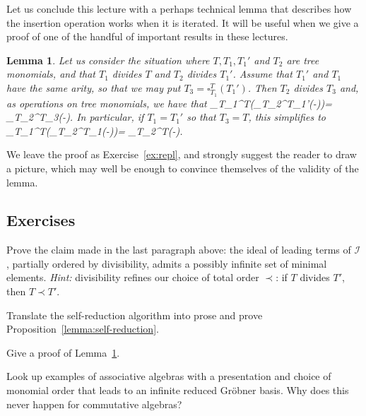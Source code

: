 \documentclass[fleqn, a4paper, twoside]{article}
\makeatletter
\newcommand{\repl}[3]{\square_{#1}^{#2}(#3)}
\newcommand{\0}{\langle 0\rangle}
\newcommand{\II}{\mathcal{I}}
\let\[\@undefined
\DeclareRobustCommand{\[}{\begin{equation}}%
\let\]\@undefined
\DeclareRobustCommand{\]}{\end{equation}}%
\theoremstyle{mytheorem}
\newtheorem{lemma}[theorem]{Lemma}
\theoremstyle{introthm}
\theoremstyle{mydefinition}
\theoremstyle{mydefinition2}
\theoremstyle{plain} %
\newcommand{\?}{\,?\,}
\theoremstyle{mytheorem}
\theoremstyle{plain} %
\makeatother
\begin{document}
Let us conclude this lecture with a perhaps technical
lemma that describes how the insertion operation
works when it is iterated. It will be useful when we
give a proof of one of the handful of important results 
in these lectures.

\begin{lemma}\label{lemma:repl}
Let us consider the situation where $T,T_1,T_1'$ and $T_2$ 
are tree monomials, and that $T_1$ divides $T$ and
$T_2$ divides $T_1'$. Assume that $T_1'$ and $T_1$ have
the same arity, so that we may put $T_3 = \repl{T_1}{T}{T_1'}$.
Then $T_2$ divides $T_3$ and, as operations on tree monomials,
we have that
\[ 
\repl{T_1}{T}{\repl{T_2}{T_1'}{-}}= 
 	\repl{T_2}{T_3}{-}.
\]
In particular, if $T_1=T_1'$ so that $T_3 = T$, this
simplifies to 
\[ 
\repl{T_1}{T}{\repl{T_2}{T_1}{-}}= 
 	\repl{T_2}{T}{-}.
\]
\end{lemma}

We leave the proof as Exercise~\ref{ex:repl}, and
strongly suggest the reader to draw a picture, which
may well be enough to convince themselves of the
validity of the lemma. 

\subsection{Exercises}

\begin{question}
Prove the claim made in the last paragraph above:
the ideal of leading terms of $\II$, partially ordered by
divisibility, admits a possibly infinite set of
minimal elements. \emph{Hint:} divisibility
refines our choice of total order $\prec$: if 
$T$ divides $T'$, then $T\prec T'$. 
\end{question}

\begin{question}\label{ex:self-reduction}
Translate the self-reduction algorithm into prose
and prove Proposition~\ref{lemma:self-reduction}.
\end{question}

\begin{question}\label{ex:repl}
Give a proof of Lemma~\ref{lemma:repl}.
\end{question}

\begin{question}
Look up examples
of associative algebras
with a presentation and choice
of monomial order that leads to
an infinite reduced Gr\"obner
basis. Why does this never happen
for commutative algebras?
\end{question}
\vfill
\end{document}
